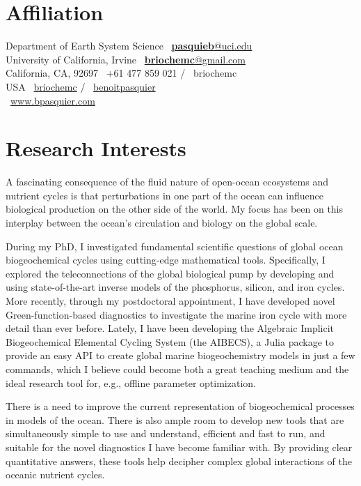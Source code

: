 \documentclass[12pt]{friggeri-cv}
\begin{document}

\section{Affiliation}


Department of Earth System Science \hfill
  \faEnvelope~\href{mailto:pasquieb@uci.edu}{\textbf{pasquieb}@uci.edu} \\
University of California, Irvine \hfill
  \faEnvelope~\href{mailto:briochemc@gmail.com}{\textbf{briochemc}@gmail.com} \\
California, CA, 92697 \hfill
\faMobile~+61 477 859 021 / \faSkype~briochemc\\
USA \hfill
  \faGithub~\href{https://github.com/briochemc}{briochemc}
    / \faGitlab~\href{https://gitlab.com/benoitpasquier}{benoitpasquier} \\
\phantom{website:} \hfill \faGlobe~\href{https://www.bpasquier.com}{www.bpasquier.com}



\section{Research Interests}
A fascinating consequence of the fluid nature of open-ocean ecosystems and nutrient cycles is that perturbations in one part of the ocean can influence biological production on the other side of the world.
My focus has been on this interplay between the ocean's circulation and biology on the global scale.

During my PhD, I investigated fundamental scientific questions of global ocean biogeochemical cycles using cutting-edge mathematical tools.
Specifically, I explored the teleconnections of the global biological pump by developing and using state-of-the-art inverse models of the phosphorus, silicon, and iron cycles.
More recently, through my postdoctoral appointment, I have developed novel Green-function-based diagnostics to investigate the marine iron cycle with more detail than ever before.
Lately, I have been developing the Algebraic Implicit Biogeochemical Elemental Cycling System (the AIBECS), a Julia package to provide an easy API to create global marine biogeochemistry models in just a few commands, which I believe could become both a great teaching medium and the ideal research tool for, e.g., offline parameter optimization.

There is a need to improve the current representation of biogeochemical processes in models of the ocean.
There is also ample room to develop new tools that are simultaneously simple to use and understand, efficient and fast to run, and suitable for the novel diagnostics I have become familiar with.
By providing clear quantitative answers, these tools help decipher complex global interactions of the oceanic nutrient cycles.
\end{document}

